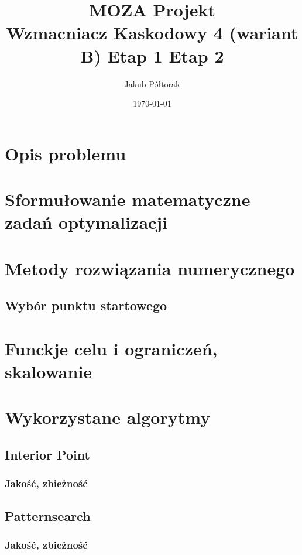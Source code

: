 \documentclass{article}
\title{\huge  \Huge \textbf{MOZA Projekt} \\ \textbf{Wzmacniacz Kaskodowy 4 (wariant B)}}
\date{\today}
\author{ \LARGE Jakub Półtorak}
\begin{document}
\maketitle
{}
\newpage
{}
\tableofcontents



\begin{center}
	\title{ \huge \textbf{Etap 1}}
\end{center}


\section{Opis problemu}
\section{Sformułowanie matematyczne zadań optymalizacji}
\section{Metody rozwiązania numerycznego}
\subsection*{Wybór punktu startowego}

\pagebreak
\begin{center}
	\title{ \huge \textbf{Etap 2}}
\end{center}

\section{Funckje celu i ograniczeń, skalowanie}
\section{Wykorzystane algorytmy}
\subsection{Interior Point}
\subsubsection*{Jakość, zbieżność}
\subsection{Patternsearch}
\subsubsection*{Jakość, zbieżność}
\end{document}
